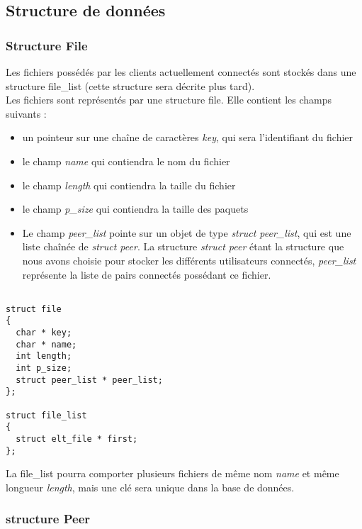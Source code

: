 
\subsection{Structure de données}

\subsubsection{Structure File}
Les fichiers possédés par les clients actuellement connectés sont stockés dans une structure file\_list (cette structure sera décrite plus tard). \\


Les fichiers sont représentés par une structure file. Elle contient les champs suivants : 

\begin{itemize}
\item un pointeur sur une chaîne de caractères \textit{key}, qui sera l'identifiant du fichier
\item le champ \textit{name} qui contiendra le nom du fichier
\item le champ \textit{length} qui contiendra la taille du fichier
\item le champ \textit{p\_size} qui contiendra la taille des paquets
\item Le champ \textit{peer\_list} pointe sur un objet de type \textit{struct peer\_list}, qui est une liste chaînée de \textit{struct peer}. La structure \textit{struct peer} étant la structure que nous avons choisie pour stocker les différents utilisateurs connectés, \textit{peer\_list} représente la liste de pairs connectés possédant ce fichier.
\end{itemize}
 
\begin{verbatim}

struct file
{
  char * key;
  char * name;
  int length;
  int p_size;
  struct peer_list * peer_list; 
};

struct file_list
{
  struct elt_file * first;
};

\end{verbatim}
La file\_list pourra comporter plusieurs fichiers de même nom \textit{name} et même longueur \textit{length}, mais une clé sera unique dans la base de données.
\subsubsection{structure Peer}
  

